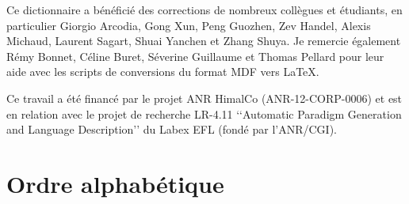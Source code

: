 Ce dictionnaire a bénéficié des corrections de nombreux collègues et étudiants, en particulier Giorgio Arcodia, Gong Xun, Peng Guozhen, Zev Handel, Alexis Michaud, Laurent Sagart, Shuai Yanchen et Zhang Shuya. Je remercie également Rémy Bonnet, Céline Buret, Séverine Guillaume et Thomas Pellard pour leur aide avec les scripts de conversions du format MDF vers \LaTeX.

Ce travail a été financé par le projet ANR HimalCo  (ANR-12-CORP-0006) et est en relation avec le projet de recherche LR-4.11 ‘‘Automatic Paradigm Generation and Language Description’’ du Labex EFL (fondé par l'ANR/CGI).

\newpage
 \section*{Ordre alphabétique }
 
		
                                                                                  		


